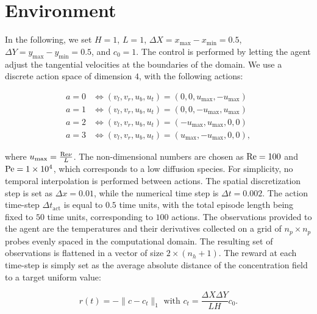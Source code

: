 \section{Environment}

In the following, we set $H=1$, $L=1$, $\Delta X = x_\text{max} - x_\text{min} = 0.5$, $\Delta Y = y_\text{max} - y_\text{min} = 0.5$, and $c_0 = 1$. The control is performed by letting the agent adjust the tangential velocities at the boundaries of the domain. We use a discrete action space of dimension $4$, with the following actions:

\begin{equation}
\label{eq:mixing_actions}
\begin{split}
	a = 0 &\iff (v_l, v_r, u_b, u_t) = (0, 0, u_\text{max}, -u_\text{max}) \\
	a = 1 &\iff (v_l, v_r, u_b, u_t) = (0, 0, -u_\text{max}, u_\text{max}) \\
	a = 2 &\iff (v_l, v_r, u_b, u_t) = (-u_\text{max}, u_\text{max}, 0, 0) \\
	a = 3 &\iff (v_l, v_r, u_b, u_t) = (u_\text{max}, -u_\text{max}, 0, 0),
\end{split}
\end{equation}

where $u_\text{max} = \frac{\text{Re} \nu}{L}$. The non-dimensional numbers are chosen as $\text{Re} = 100$ and $\text{Pe} = \num{1e4}$, which corresponds to a low diffusion species. For simplicity, no temporal interpolation is performed between actions. The spatial discretization step is set as $\Delta x = 0.01$, while the numerical time step is $\Delta t = 0.002$. The action time-step $\Delta t_\text{act}$ is equal to $0.5$ time units, with the total episode length being fixed to $50$ time units, corresponding to $100$ actions. The observations provided to the agent are the temperatures and their derivatives collected on a grid of $n_p \times n_p$ probes evenly spaced in the computational domain. The resulting set of observations is flattened in a vector of size $2 \times (n_h+1)$. The reward at each time-step is simply set as the average absolute distance of the concentration field to a target uniform value: 

\begin{equation}
	r(t) = - \lVert c - c_t \rVert_1 \text{ with } c_t = \frac{\Delta X \Delta Y}{L H} c_0.
\end{equation}

